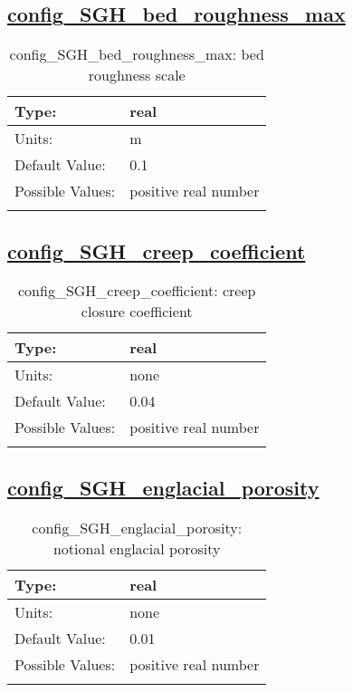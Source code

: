 \subsection[config\_SGH\_bed\_roughness\_max]{\hyperref[sec:nm_tab_subglacial_hydro]{config\_SGH\_bed\_roughness\_max}}
\label{subsec:nm_sec_config_SGH_bed_roughness_max}
\begin{center}
\begin{longtable}{| p{2.0in} || p{4.0in} |}
    \hline
    Type: & real \\
    \hline
    Units: & \si{m} \\
    \hline
    Default Value: & 0.1 \\
    \hline
    Possible Values: & positive real number \\
    \hline
    \caption{config\_SGH\_bed\_roughness\_max: bed roughness scale}
\end{longtable}
\end{center}
\subsection[config\_SGH\_creep\_coefficient]{\hyperref[sec:nm_tab_subglacial_hydro]{config\_SGH\_creep\_coefficient}}
\label{subsec:nm_sec_config_SGH_creep_coefficient}
\begin{center}
\begin{longtable}{| p{2.0in} || p{4.0in} |}
    \hline
    Type: & real \\
    \hline
    Units: & \si{none} \\
    \hline
    Default Value: & 0.04 \\
    \hline
    Possible Values: & positive real number \\
    \hline
    \caption{config\_SGH\_creep\_coefficient: creep closure coefficient}
\end{longtable}
\end{center}
\subsection[config\_SGH\_englacial\_porosity]{\hyperref[sec:nm_tab_subglacial_hydro]{config\_SGH\_englacial\_porosity}}
\label{subsec:nm_sec_config_SGH_englacial_porosity}
\begin{center}
\begin{longtable}{| p{2.0in} || p{4.0in} |}
    \hline
    Type: & real \\
    \hline
    Units: & \si{none} \\
    \hline
    Default Value: & 0.01 \\
    \hline
    Possible Values: & positive real number \\
    \hline
    \caption{config\_SGH\_englacial\_porosity: notional englacial porosity}
\end{longtable}
\end{center}
